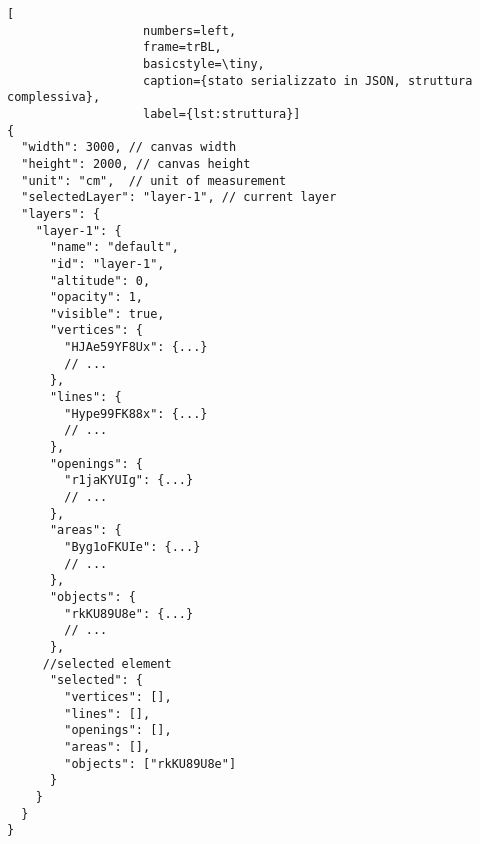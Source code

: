 

\begin{lstlisting}[
                   numbers=left,
                   frame=trBL,
                   basicstyle=\tiny,
                   caption={stato serializzato in JSON, struttura complessiva},
                   label={lst:struttura}]
{
  "width": 3000, // canvas width
  "height": 2000, // canvas height
  "unit": "cm",  // unit of measurement
  "selectedLayer": "layer-1", // current layer
  "layers": {
    "layer-1": {
      "name": "default",
      "id": "layer-1",
      "altitude": 0,
      "opacity": 1,
      "visible": true,
      "vertices": {
        "HJAe59YF8Ux": {...}
        // ...
      },
      "lines": {
        "Hype99FK88x": {...}
        // ...
      },
      "openings": {
        "r1jaKYUIg": {...}
        // ...
      },
      "areas": {
        "Byg1oFKUIe": {...}
        // ...
      },
      "objects": {
        "rkKU89U8e": {...}
        // ...
      },
     //selected element
      "selected": {
        "vertices": [],
        "lines": [],
        "openings": [],
        "areas": [],
        "objects": ["rkKU89U8e"]
      }
    }
  }
}
\end{lstlisting}
\newpage

